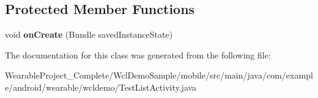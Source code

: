 \subsection*{Protected Member Functions}
\begin{DoxyCompactItemize}
\item 
void {\bfseries on\+Create} (Bundle saved\+Instance\+State)\hypertarget{classcom_1_1example_1_1android_1_1wearable_1_1wcldemo_1_1TestListActivity_af6fb4f4e2083b823b482ee3ebf94444d}{}\label{classcom_1_1example_1_1android_1_1wearable_1_1wcldemo_1_1TestListActivity_af6fb4f4e2083b823b482ee3ebf94444d}

\end{DoxyCompactItemize}


The documentation for this class was generated from the following file\+:\begin{DoxyCompactItemize}
\item 
Wearable\+Project\+\_\+\+Complete/\+Wcl\+Demo\+Sample/mobile/src/main/java/com/example/android/wearable/wcldemo/Test\+List\+Activity.\+java\end{DoxyCompactItemize}
